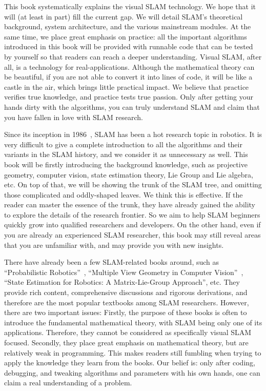 This book systematically explains the visual SLAM technology. We hope that it will (at least in part) fill the current gap. We will detail SLAM's theoretical background, system architecture, and the various mainstream modules. At the same time, we place great emphasis on practice: all the important algorithms introduced in this book will be provided with runnable code that can be tested by yourself so that readers can reach a deeper understanding. Visual SLAM, after all, is a technology for real-applications. Although the mathematical theory can be beautiful, if you are not able to convert it into lines of code, it will be like a castle in the air, which brings little practical impact. We believe that practice verifies true knowledge, and practice tests true passion. Only after getting your hands dirty with the algorithms, you can truly understand SLAM and claim that you have fallen in love with SLAM research.

Since its inception in 1986~\cite{Smith1986}, SLAM has been a hot research topic in robotics. It is very difficult to give a complete introduction to all the algorithms and their variants in the SLAM history, and we consider it as unnecessary as well. This book will be firstly introducing the background knowledge, such as projective geometry, computer vision, state estimation theory, Lie Group and Lie algebra, etc. On top of that, we will be showing the trunk of the SLAM tree, and omitting those complicated and oddly-shaped leaves. We think this is effective. If the reader can master the essence of the trunk, they have already gained the ability to explore the details of the research frontier. So we aim to help SLAM beginners quickly grow into qualified researchers and developers. On the other hand, even if you are already an experienced SLAM researcher, this book may still reveal areas that you are unfamiliar with, and may provide you with new insights.

There have already been a few SLAM-related books around, such as ``Probabilistic Robotics''~\cite{Thrun2005}, ``Multiple View Geometry in Computer Vision''~\cite{Hartley2003}, ``State Estimation for Robotics: A Matrix-Lie-Group Approach''\cite{Barfoot2016}, etc. They provide rich content, comprehensive discussions and rigorous derivations, and therefore are the most popular textbooks among SLAM researchers. However,  there are two important issues: Firstly, the purpose of these books is often to introduce the fundamental mathematical theory, with SLAM being only one of its applications. Therefore, they cannot be considered as specifically visual SLAM focused. Secondly, they place great emphasis on mathematical theory, but are relatively weak in programming. This makes readers still fumbling when trying to apply the knowledge they learn from the books. Our belief is: only after coding, debugging, and tweaking algorithms and parameters with his own hands, one can claim a real understanding of a problem.

